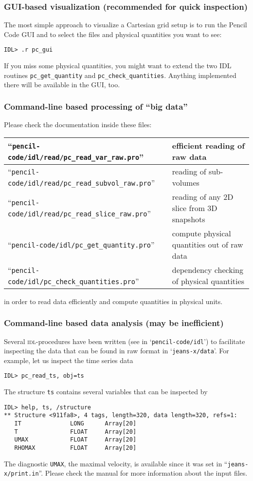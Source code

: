\documentclass[a4paper,12pt]{article}
\newcommand{\command}[1]{\texttt{#1}}
\newcommand{\file}[1]{``\texttt{#1}''}
\newcommand{\directory}[1]{`\texttt{#1}'}
\newcommand{\name}[1]{\textsc{#1}}
\newcommand{\code}[1]{\texttt{#1}}
\begin{document}
\subsubsection{GUI-based visualization (recommended for quick inspection)}
The most simple approach to visualize a Cartesian grid setup is to run the Pencil Code GUI and to select the files and physical quantities you want to see:
\begin{verbatim}
IDL> .r pc_gui
\end{verbatim}
If you miss some physical quantities, you might want to extend the two IDL routines \command{pc\_get\_quantity} and \command{pc\_check\_quantities}. Anything implemented there will be available in the GUI, too.

\subsubsection{Command-line based processing of ``big data''}
Please check the documentation inside these files:
\begin{center}
\begin{tabular}{|l|l|}\hline
  \file{pencil-code/idl/read/pc\_read\_var\_raw.pro} & efficient reading of raw data\\\hline
  \file{pencil-code/idl/read/pc\_read\_subvol\_raw.pro} & reading of sub-volumes\\\hline
  \file{pencil-code/idl/read/pc\_read\_slice\_raw.pro} & reading of any 2D slice from 3D snapshots\\\hline
  \file{pencil-code/idl/pc\_get\_quantity.pro} & compute physical quantities out of raw data\\\hline
  \file{pencil-code/idl/pc\_check\_quantities.pro} & dependency checking of physical quantities\\\hline
\end{tabular}
\end{center}
in order to read data efficiently and compute quantities in physical units.

\subsubsection{Command-line based data analysis (may be inefficient)}
Several \name{idl}-procedures have been written
(see in \directory{pencil-code/idl}) to facilitate inspecting the data
that can be found in raw format in \directory{jeans-x/data}.
For example, let us inspect the time series data
\begin{verbatim}
IDL> pc_read_ts, obj=ts
\end{verbatim}
The structure \code{ts} contains several variables that can be inspected by
\begin{verbatim}
IDL> help, ts, /structure
** Structure <911fa8>, 4 tags, length=320, data length=320, refs=1:
   IT              LONG      Array[20]
   T               FLOAT     Array[20]
   UMAX            FLOAT     Array[20]
   RHOMAX          FLOAT     Array[20]
\end{verbatim}
The diagnostic \code{UMAX}, the maximal velocity, is available since it was set
in \file{jeans-x/print.in}. Please check the manual for more information about the input files.
\end{document}
